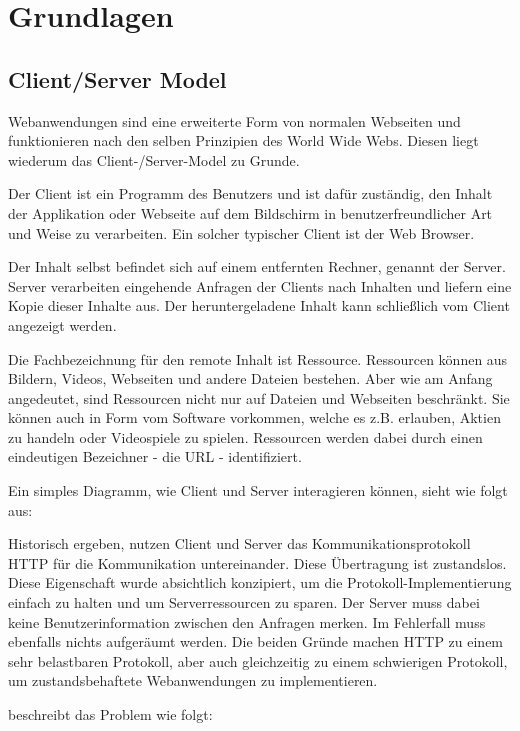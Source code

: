 \chapter{Grundlagen}

\section{Client/Server Model}
\label{sec:client_server}

Webanwendungen sind eine erweiterte Form von normalen Webseiten und funktionieren nach den selben Prinzipien des World Wide Webs. Diesen liegt wiederum das Client-/Server-Model zu Grunde.

Der Client ist ein Programm des Benutzers und ist dafür zuständig, den Inhalt der Applikation oder Webseite auf dem Bildschirm in benutzerfreundlicher Art und Weise zu verarbeiten. Ein solcher typischer Client ist der Web Browser.

Der Inhalt selbst befindet sich auf einem entfernten Rechner, genannt der Server. Server verarbeiten eingehende Anfragen der Clients nach Inhalten und liefern eine Kopie dieser Inhalte aus. Der heruntergeladene Inhalt kann schließlich vom Client angezeigt werden.

Die Fachbezeichnung für den remote Inhalt ist Ressource. Ressourcen können aus Bildern, Videos, Webseiten und andere Dateien bestehen. Aber wie am Anfang angedeutet, sind Ressourcen nicht nur auf Dateien und Webseiten beschränkt. Sie können auch in Form vom Software vorkommen, welche es z.B. erlauben, Aktien zu handeln oder Videospiele zu spielen. Ressourcen werden dabei durch einen eindeutigen Bezeichner - die URL - identifiziert.

Ein simples Diagramm, wie Client und Server interagieren können, sieht wie folgt aus:

Historisch ergeben, nutzen Client und Server das Kommunikationsprotokoll HTTP für die Kommunikation untereinander. Diese Übertragung ist zustandslos. Diese Eigenschaft wurde absichtlich konzipiert, um die Protokoll-Implementierung einfach zu halten und um Serverressourcen zu sparen. Der Server muss dabei keine Benutzerinformation zwischen den Anfragen merken. Im Fehlerfall muss ebenfalls nichts aufgeräumt werden. Die beiden Gründe machen HTTP zu einem sehr belastbaren Protokoll, aber auch gleichzeitig zu einem schwierigen Protokoll, um zustandsbehaftete Webanwendungen zu implementieren.

\citep[Background]{launchschool} beschreibt das Problem wie folgt:

